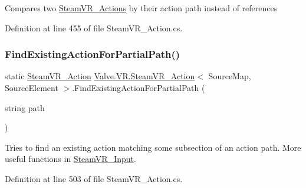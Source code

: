 Compares two \mbox{\hyperlink{class_valve_1_1_v_r_1_1_steam_v_r___actions}{Steam\+V\+R\+\_\+\+Actions}} by their action path instead of references 



Definition at line 455 of file Steam\+V\+R\+\_\+\+Action.\+cs.

\mbox{\label{class_valve_1_1_v_r_1_1_steam_v_r___action_aa10a1be562d9c134f16601b579ec6e65}} 
\subsubsection{\texorpdfstring{FindExistingActionForPartialPath()}{FindExistingActionForPartialPath()}}
{\footnotesize\ttfamily static \mbox{\hyperlink{class_valve_1_1_v_r_1_1_steam_v_r___action}{Steam\+V\+R\+\_\+\+Action}} \mbox{\hyperlink{class_valve_1_1_v_r_1_1_steam_v_r___action}{Valve.\+V\+R.\+Steam\+V\+R\+\_\+\+Action}}$<$ Source\+Map, Source\+Element $>$.Find\+Existing\+Action\+For\+Partial\+Path (\begin{DoxyParamCaption}\item[{string}]{path }\end{DoxyParamCaption})\hspace{0.3cm}{\ttfamily [static]}}



Tries to find an existing action matching some subsection of an action path. More useful functions in \mbox{\hyperlink{class_valve_1_1_v_r_1_1_steam_v_r___input}{Steam\+V\+R\+\_\+\+Input}}. 



Definition at line 503 of file Steam\+V\+R\+\_\+\+Action.\+cs.

\mbox{\label{class_valve_1_1_v_r_1_1_steam_v_r___action_a76c9b93e06e87e5fa861423bd4102c4c}} 
